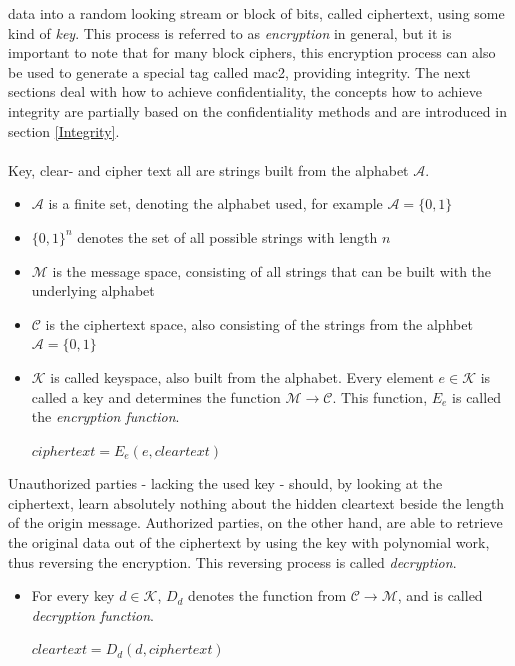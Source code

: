 data into a random looking stream or block of bits, called ciphertext, using some kind of
\textit{key}. This process is referred to as \textit{encryption} in general, but it is important to note that for many block ciphers, this encryption process
can also be used to generate a special tag called \gls{mac2}, providing integrity. The next sections deal with how to achieve confidentiality, the 
concepts how to achieve integrity are partially based on the confidentiality methods and are introduced in section \ref{Integrity}.
\\
\\
Key, clear- and cipher text all are strings built from the alphabet $\mathcal{A}$. 
\begin{itemize}
 \item $\mathcal{A}$ is a finite set, denoting the alphabet used, for example
 $\mathcal{A} = \{0, 1\}$
 \item $\{0, 1\}^n$ denotes the set of all possible strings with length $n$
 \item $\mathcal{M}$ is the message space, consisting of all strings that can be built with the 
 underlying alphabet
 \item $\mathcal{C}$ is the ciphertext space, also consisting of the strings from 
 the alphbet
$\mathcal{A} = \{0, 1\}$
\item $\mathcal{K}$ is called keyspace, also built from the alphabet. Every element
 $e \in \mathcal{K}$ is called a key and determines the function $\mathcal{M} \rightarrow \mathcal{C}$.
 This function, $E_e$ is called the \textit{encryption function}. 
  \begin{center}
 $ciphertext = E_e(e, cleartext)$
  \end{center}
\end{itemize}
Unauthorized parties - lacking the used key - should, by looking at the ciphertext, learn
absolutely nothing about the hidden cleartext beside the length of the origin message. Authorized parties, on the other hand, are
able to retrieve the original data out of the ciphertext by using the key with polynomial work, thus reversing
the encryption. This reversing process is called \textit{decryption}.
\begin{itemize}
 \item For every key $d \in \mathcal{K}$, $D_d$ denotes the function from $\mathcal{C} \rightarrow
  \mathcal{M}$, and is called \textit{decryption function}.
  \begin{center}
  $cleartext  = D_d(d, ciphertext)$
    \end{center}
\end{itemize}

